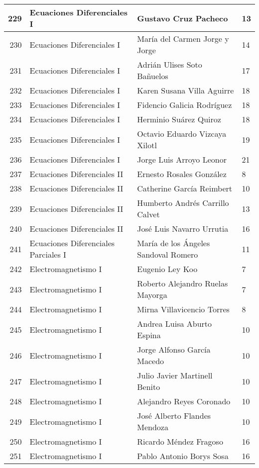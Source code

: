\begin{table}[ht]
\begin{tabular}{rlll}
  229 & Ecuaciones Diferenciales I & Gustavo Cruz Pacheco & 13 \\ \hline
  230 & Ecuaciones Diferenciales I & María del Carmen Jorge y Jorge & 14 \\ \hline
  231 & Ecuaciones Diferenciales I & Adrián Ulises Soto Bañuelos & 17 \\ \hline
  232 & Ecuaciones Diferenciales I & Karen Susana Villa Aguirre & 18 \\ \hline
  233 & Ecuaciones Diferenciales I & Fidencio Galicia Rodríguez & 18 \\ \hline
  234 & Ecuaciones Diferenciales I & Herminio Suárez Quiroz & 18 \\ \hline
  235 & Ecuaciones Diferenciales I & Octavio Eduardo Vizcaya Xilotl & 19 \\ \hline
  236 & Ecuaciones Diferenciales I & Jorge Luis Arroyo Leonor & 21 \\ \hline
  237 & Ecuaciones Diferenciales II & Ernesto Rosales González & 8 \\ \hline
  238 & Ecuaciones Diferenciales II & Catherine García Reimbert & 10 \\ \hline
  239 & Ecuaciones Diferenciales II & Humberto Andrés Carrillo Calvet & 13 \\ \hline
  240 & Ecuaciones Diferenciales II & José Luis Navarro Urrutia & 16 \\ \hline
  241 & Ecuaciones Diferenciales Parciales I & María de los Ángeles Sandoval Romero & 11 \\ \hline
  242 & Electromagnetismo I & Eugenio Ley Koo & 7 \\ \hline
  243 & Electromagnetismo I & Roberto Alejandro Ruelas Mayorga & 7 \\ \hline
  244 & Electromagnetismo I & Mirna Villavicencio Torres & 8 \\ \hline
  245 & Electromagnetismo I & Andrea Luisa Aburto Espina & 10 \\ \hline
  246 & Electromagnetismo I & Jorge Alfonso García Macedo & 10 \\ \hline
  247 & Electromagnetismo I & Julio Javier Martinell Benito & 10 \\ \hline
  248 & Electromagnetismo I & Alejandro Reyes Coronado & 10 \\ \hline
  249 & Electromagnetismo I & José Alberto Flandes Mendoza & 10 \\ \hline
  250 & Electromagnetismo I & Ricardo Méndez Fragoso & 16 \\ \hline
  251 & Electromagnetismo I & Pablo Antonio Borys Sosa & 16 \\ \hline

\end{tabular}
\end{table}
